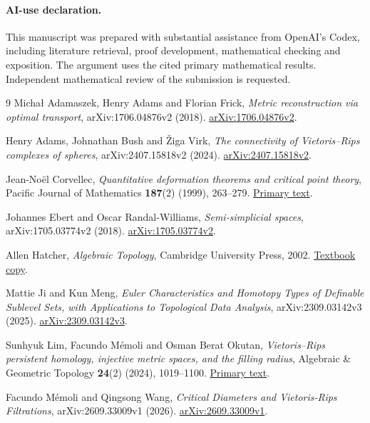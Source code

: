 \documentclass[11pt,a4paper]{article}
\theoremstyle{definition}
\begin{document}
\paragraph{AI-use declaration.}
This manuscript was prepared with substantial assistance from OpenAI's Codex, including literature retrieval, proof development, mathematical checking and exposition. The argument uses the cited primary mathematical results. Independent mathematical review of the submission is requested.

\begin{thebibliography}{9}
Micha{\l} Adamaszek, Henry Adams and Florian Frick,
\emph{Metric reconstruction via optimal transport},
arXiv:1706.04876v2 (2018).
\href{https://arxiv.org/abs/1706.04876v2}{arXiv:1706.04876v2}.

Henry Adams, Johnathan Bush and {\v Z}iga Virk,
\emph{The connectivity of Vietoris--Rips complexes of spheres},
arXiv:2407.15818v2 (2024).
\href{https://arxiv.org/abs/2407.15818v2}{arXiv:2407.15818v2}.

Jean-No\"el Corvellec,
\emph{Quantitative deformation theorems and critical point theory},
Pacific Journal of Mathematics \textbf{187}(2) (1999), 263--279.
\href{https://msp.org/pjm/1999/187-2/pjm-v187-n2-p04-s.pdf}{Primary text}.

Johannes Ebert and Oscar Randal-Williams,
\emph{Semi-simplicial spaces},
arXiv:1705.03774v2 (2018).
\href{https://arxiv.org/abs/1705.03774v2}{arXiv:1705.03774v2}.

Allen Hatcher,
\emph{Algebraic Topology},
Cambridge University Press, 2002.
\href{https://math.uchicago.edu/~farb/algtop2023/Hatcher.pdf}{Textbook copy}.

Mattie Ji and Kun Meng,
\emph{Euler Characteristics and Homotopy Types of Definable Sublevel Sets, with Applications to Topological Data Analysis},
arXiv:2309.03142v3 (2025).
\href{https://arxiv.org/abs/2309.03142v3}{arXiv:2309.03142v3}.

Sunhyuk Lim, Facundo M\'emoli and Osman Berat Okutan,
\emph{Vietoris--Rips persistent homology, injective metric spaces, and the filling radius},
Algebraic \& Geometric Topology \textbf{24}(2) (2024), 1019--1100.
\href{https://msp.org/agt/2024/24-2/agt-v24-n2-p10-s.pdf}{Primary text}.

Facundo M\'emoli and Qingsong Wang,
\emph{Critical Diameters and Vietoris-Rips Filtrations},
arXiv:2609.33009v1 (2026).
\href{https://arxiv.org/abs/2609.33009v1}{arXiv:2609.33009v1}.
\end{thebibliography}
\end{document}
